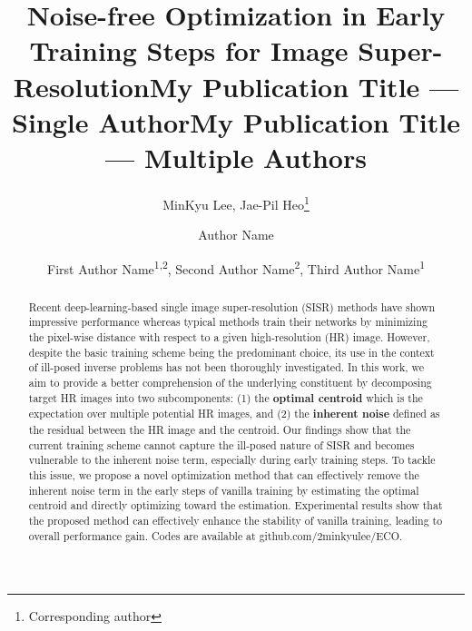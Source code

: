 \documentclass[letterpaper]{article} %
\title{Noise-free Optimization in Early Training Steps for Image Super-Resolution}
\author{
    MinKyu Lee,
    Jae-Pil Heo\thanks{Corresponding author}
}
\title{My Publication Title --- Single Author}
\author {
    Author Name
}
\title{My Publication Title --- Multiple Authors}
\author {
    First Author Name\textsuperscript{\rm 1,\rm 2},
    Second Author Name\textsuperscript{\rm 2},
    Third Author Name\textsuperscript{\rm 1}
}
\begin{document}
\maketitle


\begin{abstract}
%
Recent deep-learning-based single image super-resolution (SISR) methods have shown impressive performance whereas typical methods train their networks by minimizing the pixel-wise distance with respect to a given high-resolution (HR) image.
%
However, despite the basic training scheme being the predominant choice, its use in the context of ill-posed inverse problems has not been thoroughly investigated.
%
In this work, we aim to provide a better comprehension of the underlying constituent by decomposing target HR images into two subcomponents: (1) the \textbf{optimal centroid} which is the expectation over multiple potential HR images, and (2) the \textbf{inherent noise} defined as the residual between the HR image and the centroid.
%
Our findings show that the current training scheme cannot capture the ill-posed nature of SISR and becomes vulnerable to the inherent noise term, especially during early training steps.
%
To tackle this issue, we propose a novel optimization method that can effectively remove the inherent noise term in the early steps of vanilla training by estimating the optimal centroid and directly optimizing toward the estimation.
%
%
Experimental results show that the proposed method can effectively enhance the stability of vanilla training, leading to overall performance gain. Codes are available at github.com/2minkyulee/ECO.

\end{abstract}
\end{document}
